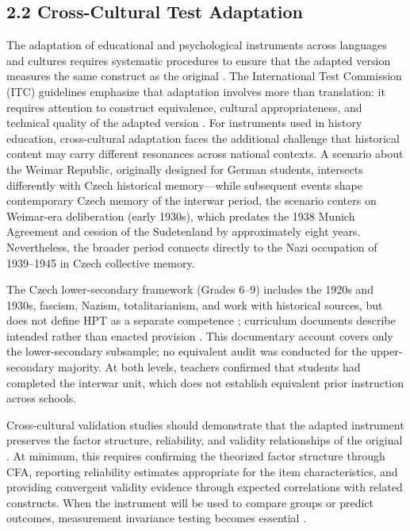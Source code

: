 \documentclass[PCJ,Unicode,screen,mode=plain]{cedram}
\begin{document}
\subsection*{2.2 Cross-Cultural Test Adaptation}\label{cross-cultural-test-adaptation}

The adaptation of educational and psychological instruments across languages and cultures requires systematic procedures to ensure that the adapted version measures the same construct as the original \citep{Hambleton2005,ITC2017}. The International Test Commission (ITC) guidelines emphasize that adaptation involves more than translation: it requires attention to construct equivalence, cultural appropriateness, and technical quality of the adapted version \citep{ITC2017}. For instruments used in history education, cross-cultural adaptation faces the additional challenge that historical content may carry different resonances across national contexts. A scenario about the Weimar Republic, originally designed for German
students, intersects differently with Czech historical memory---while
subsequent events shape contemporary Czech memory of the interwar
period, the scenario centers on Weimar-era deliberation (early 1930s),
which predates the 1938 Munich Agreement and cession of the
Sudetenland by approximately eight years. Nevertheless, the broader
period connects directly to the Nazi occupation of 1939--1945 in Czech
collective memory.

The Czech lower-secondary framework (Grades 6--9) includes the 1920s and
1930s, fascism, Nazism, totalitarianism, and work with historical sources, but
does not define HPT as a separate competence \citep[pp.~54--58, 140,
143]{RVPZV2023}; curriculum documents describe intended rather than enacted
provision \citep{Kaleta2025Sticking}. This documentary account covers only the
lower-secondary subsample; no equivalent audit was conducted for the
upper-secondary majority. At both levels, teachers confirmed that students had
completed the interwar unit, which does not establish equivalent prior
instruction across schools.

Cross-cultural validation studies should demonstrate that the adapted instrument preserves the factor structure, reliability, and validity relationships of the original \citep{Hambleton2005}. At minimum, this requires confirming the theorized factor structure through CFA, reporting reliability estimates appropriate for the item characteristics, and providing convergent validity evidence through expected correlations with related constructs. When the instrument will be used to compare groups or predict outcomes, measurement invariance testing becomes essential \citep{AERA2014Standards}.
\end{document}
